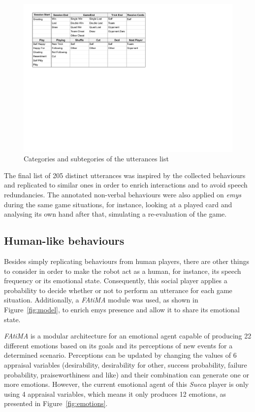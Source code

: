 \begin{figure}[ht]
	\centering
    \includegraphics[width=1\textwidth]{./img/6/utterances}
	\caption{Categories and subtegories of the utterances list}
\label{fig:utterances}
\end{figure}

The final list of 205 distinct utterances was inspired by the collected behaviours and replicated to similar ones in order to enrich interactions and to avoid speech redundancies.
The annotated non-verbal behaviours were also applied on \emph{emys} during the same game situations, for instance, looking at a played card and analysing its own hand after that, simulating a re-evaluation of the game.

\subsection{Human-like behaviours}

Besides simply replicating behaviours from human players, there are other things to consider in order to make the robot act as a human, for instance, its speech frequency or its emotional state.
Consequently, this social player applies a probability to decide whether or not to perform an utterance for each game situation.
Additionally, a \emph{FAtiMA} module was used, as shown in Figure~\ref{fig:model}, to enrich \ac{emys} presence and allow it to share its emotional state.

\emph{FAtiMA} is a modular architecture for an emotional agent capable of producing 22 different emotions based on its goals and its perceptions of new events for a determined scenario.
Perceptions can be updated by changing the values of 6 appraisal variables (desirability, desirability for other, success probability, failure probability, praiseworthiness and like) and their combination can generate one or more emotions.
However, the current emotional agent of this \emph{Sueca} player is only using 4 appraisal variables, which means it only produces 12 emotions, as presented in Figure~\ref{fig:emotions}.

